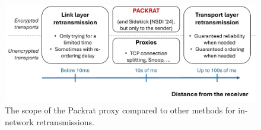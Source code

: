 \begin{figure}[t]
    \centering
    \includegraphics[width=0.9\linewidth]{packrat/figures/packrat-scope.pdf}
    \caption{The scope of the Packrat proxy compared to other methods for in-network retransmissions.}
    \label{fig:packrat:packrat-scope}
\end{figure}